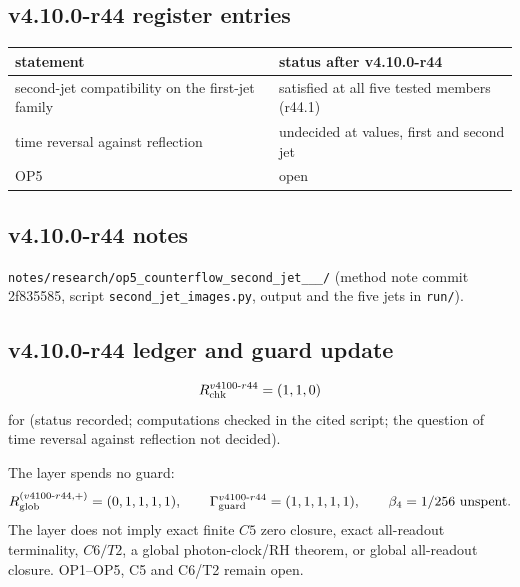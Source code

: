\subsection*{v4.10.0-r44 register entries}
\label{subsec:v4100-r44-register}

\begin{center}
\small
\begin{tabular}{@{}>{\raggedright\arraybackslash}p{}>{\raggedright\arraybackslash}p{}@{}}
\toprule
statement & status after v4.10.0-r44\\
\midrule
second-jet compatibility on the first-jet family & satisfied at all five tested members (r44.1)\\
time reversal against reflection & undecided at values, first and second jet\\
OP5 & open\\
\bottomrule
\end{tabular}
\end{center}

\subsection*{v4.10.0-r44 notes}
\label{subsec:v4100-r44-notes}

\texttt{notes/\allowbreak research/\allowbreak op5\_\allowbreak counterflow\_\allowbreak second\_\allowbreak jet\_\_\_/} (method note commit 2f835585,
script \texttt{second\_\allowbreak jet\_\allowbreak images.py}, output and the five jets in \texttt{run/}).

\subsection*{v4.10.0-r44 ledger and guard update}
\label{subsec:v4100-r44-ledger-guard}

\[
R_{\rm chk}^{v4100\text{-}r44}=(1,1,0)
\]
for (status recorded; computations checked in the cited script; the question of time reversal against reflection not decided).

The layer spends no guard:
\[
R_{\rm glob}^{(v4100\text{-}r44,+)}=(0,1,1,1,1),
\qquad
\Gamma_{\rm guard}^{v4100\text{-}r44}=(1,1,1,1,1),
\qquad
\beta_4=1/256\ \text{unspent}.
\]
The layer does not imply exact finite \(C5\) zero closure, exact all-readout terminality, \(C6/T2\), a global photon-clock/RH theorem,
or global all-readout closure.  OP1--OP5, C5 and C6/T2 remain open.
